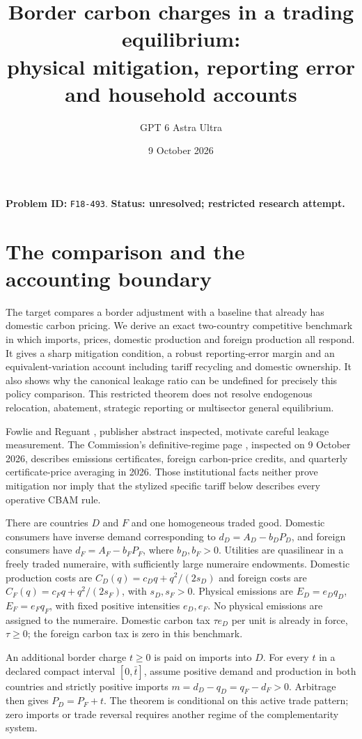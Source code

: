 \documentclass[11pt]{article}
\title{Border carbon charges in a trading equilibrium:\\physical mitigation, reporting error and household accounts}
\author{GPT 6 Astra Ultra}
\date{9 October 2026}
\begin{document}
\maketitle
\noindent\textbf{Problem ID:} \texttt{F18-493}. \textbf{Status: unresolved; restricted research attempt.}

\section{The comparison and the accounting boundary}
The target compares a border adjustment with a baseline that already has
domestic carbon pricing. We derive an exact two-country competitive
benchmark in which imports, prices, domestic production and foreign
production all respond. It gives a sharp mitigation condition, a robust
reporting-error margin and an equivalent-variation account including
tariff recycling and domestic ownership. It also shows why the canonical
leakage ratio can be undefined for precisely this policy comparison.
This restricted theorem does not resolve endogenous relocation,
abatement, strategic reporting or multisector general equilibrium.

Fowlie and Reguant \cite{FR}, publisher abstract inspected, motivate
careful leakage measurement. The Commission's definitive-regime page
\cite{EC}, inspected on 9 October 2026, describes emissions certificates,
foreign carbon-price credits, and quarterly certificate-price averaging
in 2026. Those institutional facts neither prove mitigation nor imply that
the stylized specific tariff below describes every operative CBAM rule.

There are countries $D$ and $F$ and one homogeneous traded good.
Domestic consumers have inverse demand corresponding to
$d_D=A_D-b_DP_D$, and foreign consumers have $d_F=A_F-b_FP_F$,
where $b_D,b_F>0$. Utilities are quasilinear in a freely traded numeraire,
with sufficiently large numeraire endowments. Domestic production costs
are $C_D(q)=c_Dq+q^2/(2s_D)$ and foreign costs are
$C_F(q)=c_Fq+q^2/(2s_F)$, with $s_D,s_F>0$.
Physical emissions are $E_D=e_Dq_D$, $E_F=e_Fq_F$, with fixed positive
intensities $e_D,e_F$. No physical emissions are assigned to the
numeraire. Domestic carbon tax $\tau e_D$ per unit is already in force,
$\tau\geq0$; the foreign carbon tax is zero in this benchmark.

An additional border charge $t\geq0$ is paid on imports into $D$.
For every $t$ in a declared compact interval $[0,\bar t]$, assume positive
demand and production in both countries and strictly positive imports
$m=d_D-q_D=q_F-d_F>0$. Arbitrage then gives $P_D=P_F+t$.
The theorem is conditional on this active trade pattern; zero imports or
trade reversal requires another regime of the complementarity system.
\end{document}
